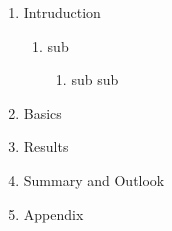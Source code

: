 \begin{enumerate}
\item Intruduction
	\begin{enumerate}
	\item sub
		\begin{enumerate}
		\item sub sub
		\end{enumerate}
	\end{enumerate}

\item Basics
\item Results
\item Summary and Outlook
\item Appendix

\end{enumerate}
